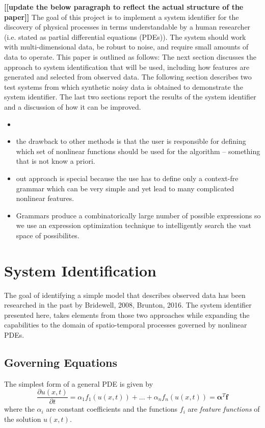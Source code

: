 \documentclass{article}
\newcommand{\todo}[1]{\textbf{[[#1]]}}
\begin{document}
\todo{update the below paragraph to reflect the actual structure of the paper}
The goal of this project is to implement a system identifier for the discovery of physical processes in terms understandable by a human researcher (i.e. stated as partial differential equations (PDEs)). The system should work with multi-dimensional data, be robust to noise, and require small amounts of data to operate. This paper is outlined as follows: The next section discusses the approach to system identification that will be used, including how features are generated and selected from observed data. The following section describes two test systems from which synthetic noisy data is obtained to demonstrate the system identifier. The last two sections report the results of the system identifier and a discussion of how it can be improved.

\begin{itemize}
\item 
\item the drawback to other methods is that the user is responsible for defining which set of nonlinear functions should be used for the algorithm -- something that is not know a priori.
\item out approach is special because the use has to define only a context-fre grammar which can be very simple and yet lead to many complicated nonlinear features.
\item Grammars produce a combinatorically large number of possible expressions so we use an expression optimization technique to intelligently search the vast space of possibilites.
\end{itemize}


\section{System Identification}
\label{systemidentification}

The goal of identifying a simple model that describes observed data has been researched in the past by Bridewell, 2008, Brunton, 2016. The system identifier presented here, takes elements from those two approaches while expanding the capabilities to the domain of spatio-temporal processes governed by nonlinear PDEs. 

\subsection{Governing Equations}
The simplest form of a general PDE is given by
\[ \frac{\partial u(x,t)}{\partial t} = \alpha_1 f_1(u(x,t)) + ... + \alpha_n f_n(u(x,t)) = \bm{\alpha}^T \bm{f} \]
where the $\alpha_i$ are constant coefficients and the functions $f_i$ are \textit{feature functions} of the solution $u(x,t)$.
\end{document}

